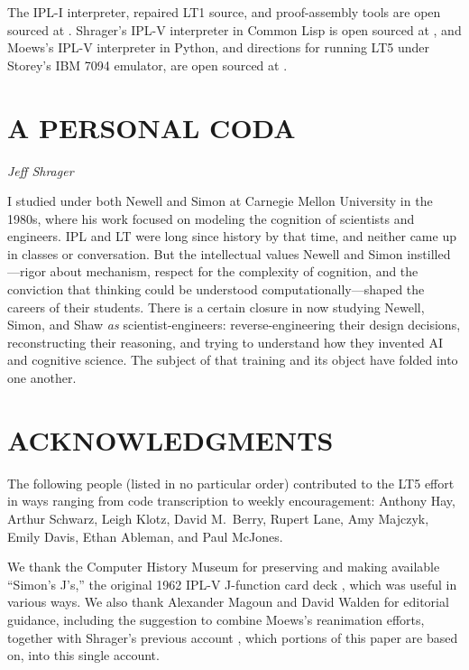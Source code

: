 \documentclass{IEEEcsmag}
\begin{document}
The IPL-I interpreter, repaired LT1 source, and proof-assembly tools
are open sourced at \cite{moewsrepo}.
Shrager's IPL-V interpreter in Common Lisp is open sourced at
\cite{shragerrepo}, and Moews's IPL-V interpreter
in Python, and directions for running LT5 under Storey's IBM 7094
emulator, are open sourced at \cite{moewsrepo2}.

\section{A PERSONAL CODA}

%
%

{\em Jeff Shrager}

I studied under both Newell and Simon at Carnegie
Mellon University in the 1980s, where his work focused on modeling the
cognition of scientists and engineers. IPL and LT were long since
history by that time, and neither came up in classes or
conversation. But the intellectual values Newell and Simon
instilled---rigor about mechanism, respect for the complexity of
cognition, and the conviction that thinking could be understood
computationally---shaped the careers of their students. There is a
certain closure in now studying Newell, Simon, and Shaw \textit{as}
scientist-engineers: reverse-engineering their design decisions,
reconstructing their reasoning, and trying to understand how they
invented AI and cognitive science. The subject of that training and
its object have folded into one another.

\section{ACKNOWLEDGMENTS}


The following people (listed in no particular order) contributed to
the LT5 effort in ways ranging from code transcription to weekly
encouragement: Anthony Hay, Arthur Schwarz, Leigh Klotz, David
M.\ Berry, Rupert Lane, Amy Majczyk, Emily Davis, Ethan Ableman, and
Paul McJones. 

We thank the Computer History Museum for preserving and making
available ``Simon's J's,'' the original 1962 IPL-V J-function card
deck \cite{bochannek2012simonsjs},
which was useful in various ways. We also thank Alexander
Magoun and David Walden for editorial guidance, including the
suggestion to combine Moews's reanimation efforts, together
with Shrager's previous account \cite{shrager2026}, which portions
of this paper are based on, into this single account.
\end{document}
